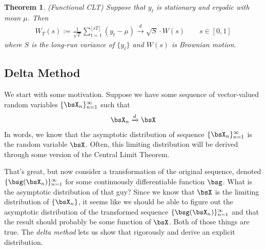 \documentclass[12pt]{article}
\theoremstyle{plain}
\newtheorem{thm}{Theorem}[section]
\theoremstyle{definition}
\theoremstyle{remark}
\newcommand{\dto}{\xrightarrow{d}}
\newcommand{\ninf}{_{n=1}^\infty}
\begin{document}
\begin{thm}\emph{(Functional CLT)}
Suppose that $y_t$ is stationary and ergodic with mean $\mu$. Then
\begin{align*}
  W_T(s) :=
  \frac{1}{\sqrt{T}}
  \sum_{t=1}^{\lfloor s T\rfloor}
  (y_t-\mu) \dto \sqrt{S}\cdot W(s)
  \qquad
  s\in [0,1]
\end{align*}
where $S$ is the long-run variance of $\{y_t\}$ and $W(s)$ is Brownian
motion.
\end{thm}


\clearpage
\subsection{Delta Method}

We start with some motivation.
Suppose we have some sequence of vector-valued random variables
$\{\bsX_n\}\ninf$ such that
\begin{align*}
  \bsX_n \dto \bsX
\end{align*}
In words, we know that the asymptotic distribution of sequence
$\{\bsX_n\}\ninf$ is the random variable $\bsX$.
Often, this limiting distribution will be derived through some version
of the Central Limit Theorem.

That's great, but now consider a transformation of the original
sequence, denoted $\{\bsg(\bsX_n)\}\ninf$ for some continuously
differentiable function $\bsg$. What is the asymptotic distribution of
that guy? Since we know that $\bsX$ is the limiting distribution of
$\{\bsX_n\}$, it seems like we should be able to figure out the
asymptotic distribution of the transformed sequence
$\{\bsg(\bsX_n)\}\ninf$ and that the result should probably be some
function of $\bsX$. Both of those things are true. The
\emph{delta method} lets us show that rigorously and derive an explicit
distribution.
\end{document}
